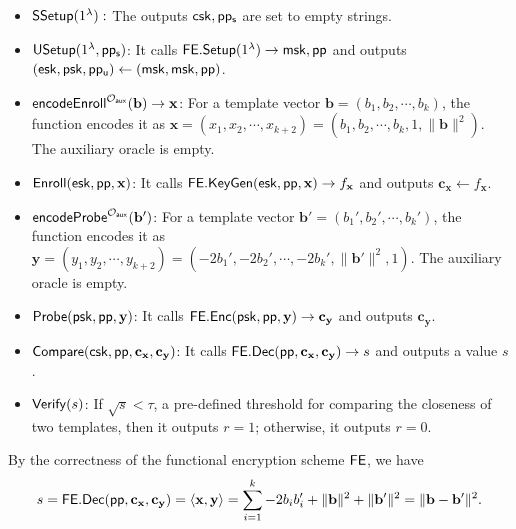 \begin{itemize}

	\item ${\sf SSetup}(1^\lambda):$ The outputs ${\sf csk, pp_s}$ are set to empty strings.
	
	\item ${\sf USetup}(1^\lambda, {\sf pp_s})$: It calls ${\sf FE.Setup}(1^\lambda) \to {\sf msk}, {\sf pp}$ and outputs $({\sf esk}, {\sf psk}, {\sf pp_u}) \gets ({\sf msk}, {\sf msk}, {\sf pp})$.

	\item ${\sf encodeEnroll}^{\mathcal{O}_{\sf aux}}({\mathbf{b}}) \to \mathbf{x}$: For a template vector $\mathbf{b} = (b_1, b_2, \cdots, b_k)$, the function encodes it as $\mathbf{x} = (x_1, x_2, \cdots, x_{k+2}) = (b_1, b_2, \cdots, b_k, 1, \|\mathbf{b}\|^2)$. The auxiliary oracle is empty.

	\item ${\sf Enroll}({\sf esk}, {\sf pp}, \mathbf{x})$: It calls ${\sf FE.KeyGen}({\sf esk}, {\sf pp}, \mathbf{x}) \to f_\mathbf{x}$ and outputs $\mathbf{c_x} \gets f_\mathbf{x}$.

	\item ${\sf encodeProbe}^{\mathcal{O}_{\sf aux}}({\mathbf{b'}})$: For a template vector $\mathbf{b'} = (b_1', b_2', \cdots, b_k')$, the function encodes it as $\mathbf{y} = (y_1, y_2, \cdots, y_{k+2}) = (-2b_1', -2b_2', \cdots, -2b_k', \|\mathbf{b'}\|^2, 1)$. The auxiliary oracle is empty.

	\item ${\sf Probe}({\sf psk}, {\sf pp}, \mathbf{y})$: It calls ${\sf FE.Enc}({\sf psk}, {\sf pp}, \mathbf{y}) \to \mathbf{c_y}$ and outputs $\mathbf{c_y}$.

	\item ${\sf Compare}({\sf csk}, {\sf pp}, \mathbf{c_x}, \mathbf{c_y)}$: It calls ${\sf FE.Dec}({\sf pp}, \mathbf{c_x}, \mathbf{c_y}) \to s$ and outputs a value $s$.

	\item ${\sf Verify}(s)$: If $\sqrt{s} < \tau$, a pre-defined threshold for comparing the closeness of two templates, then it outputs $r = 1$; otherwise, it outputs $r = 0$.

\end{itemize}

By the correctness of the functional encryption scheme $\sf FE$, we have
\[
	s = {\sf FE.Dec}({\sf pp}, \mathbf{c_x}, \mathbf{c_y}) = \langle \mathbf{x}, \mathbf{y} \rangle = \sum_{i=1}^k -2b_ib_i' + \|\mathbf{b}\|^2 + \|\mathbf{b'}\|^2 = \| \mathbf{b} - \mathbf{b'} \|^2.
\]

